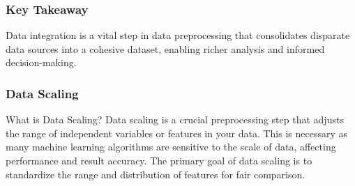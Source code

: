 \documentclass[aspectratio=169]{beamer}
\begin{document}
\begin{frame}[fragile]
    \frametitle{Key Takeaway}
    Data integration is a vital step in data preprocessing that consolidates disparate data sources into a cohesive dataset, enabling richer analysis and informed decision-making.
\end{frame}

\begin{frame}[fragile]
  \frametitle{Data Scaling}
  \begin{block}{What is Data Scaling?}
    Data scaling is a crucial preprocessing step that adjusts the range of independent variables or features in your data. This is necessary as many machine learning algorithms are sensitive to the scale of data, affecting performance and result accuracy. The primary goal of data scaling is to standardize the range and distribution of features for fair comparison.
  \end{block}
\end{frame}
\end{document}
